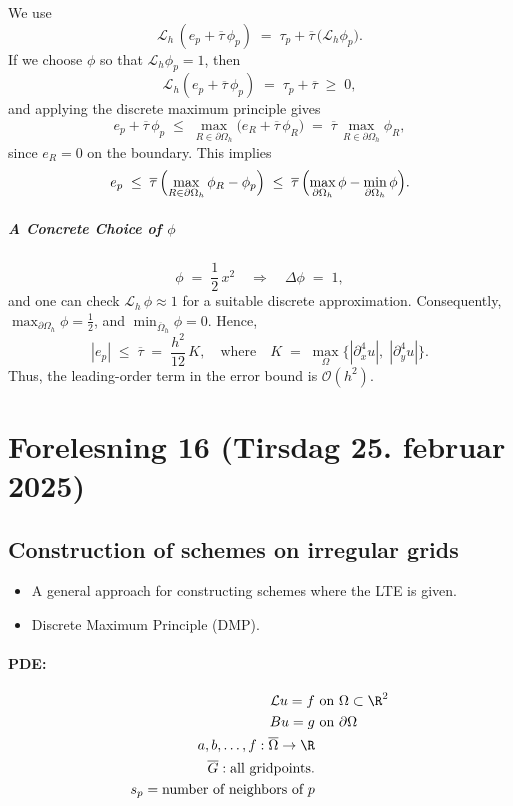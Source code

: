 We use
\[
  \mathcal{L}_h\,(e_p + \overline{\tau}\,\phi_p)
  \;=\;
  \tau_p + \overline{\tau}\,\bigl(\mathcal{L}_h \phi_p\bigr).
\]
If we choose \(\phi\) so that \(\mathcal{L}_h \phi_p = 1\), then
\[
  \mathcal{L}_h (e_p + \overline{\tau}\,\phi_p) \;=\; \tau_p + \overline{\tau} \;\ge\; 0,
\]
and applying the discrete maximum principle gives
\[
  e_p + \overline{\tau}\,\phi_p
  \;\le\;
  \max_{R \in \partial\Omega_h} \bigl(e_R + \overline{\tau}\,\phi_R\bigr)
  \;=\;
  \overline{\tau} \,\max_{R \in \partial\Omega_h}\phi_R,
\]
since \(e_R = 0\) on the boundary. This implies
\[
  e_p
  \;\le\;
  \overline{\tau}\,
  \Bigl(\max_{R \in \partial\Omega_h}\phi_R - \phi_p\Bigr)
  \;\le\;
  \overline{\tau}\,
  \Bigl(\max_{\partial\Omega_h}\phi - \min_{\partial\Omega_h}\phi\Bigr).
\]

\subparagraph{A Concrete Choice of \(\phi\)}
\[
  \phi \;=\; \frac12\,x^2
  \quad\Longrightarrow\quad
  \Delta \phi \;=\; 1,
\]
and one can check
\(\mathcal{L}_h\,\phi \approx 1\) for a suitable discrete approximation. Consequently, \(\max_{\partial\Omega_h} \phi = \tfrac{1}{2}\), and \(\min_{\overline{\Omega}_h}\phi = 0\). Hence,
\[
  |e_p|
  \;\le\;
  \overline{\tau}
  \;=\;
  \frac{h^2}{12}\,K,
  \quad
  \text{where}
  \quad
  K \;=\;
  \max_{\Omega}\bigl\{|\partial_x^4 u|,\;|\partial_y^4 u|\bigr\}.
\]
Thus, the leading-order term in the error bound is \(\mathcal{O}(h^2)\).

\clearpage
\section{Forelesning 16 (Tirsdag 25. februar 2025)}
\subsection{Construction of schemes on irregular grids}
\begin{itemize}
  \item A general approach for constructing schemes where the LTE is given.
  \item Discrete Maximum Principle (DMP).
\end{itemize}

\paragraph{PDE:}
\begin{align*}
  \mathcal{L}u = f & \text{ on } \Omega \subset \R^2 \\
  Bu = g           & \text{ on } \partial\Omega      \\
  a,b,\dots, f: \overline{\Omega} \to \R             \\
  \overline{G}: \text{all gridpoints.}               \\
  s_p = \text{number of neighbors of } p             \\
\end{align*}


